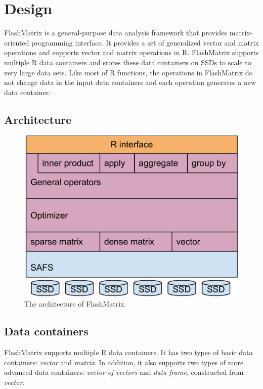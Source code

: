 \section{Design}

FlashMatrix is a general-purpose data analysis framework that provides
matrix-oriented programming interface. It provides a set of generalized
vector and matrix operations and supports vector and matrix operations in R.
FlashMatrix supports multiple R data containers and stores these data containers
on SSDs to scale to very large data sets. Like most of R functions,
the operations in FlashMatrix do not change data in the input data containers
and each operation generates a new data container.

\subsection{Architecture}

\begin{figure}
\centering
\includegraphics[scale=0.3]{./architecture.pdf}
\vspace{-5pt}
\caption{The architecture of FlashMatrix.}
\vspace{-5pt}
\label{arch}
\end{figure}

\subsection{Data containers}
FlashMatrix supports multiple R data containers. It has two types of basic
data containers: \textit{vector} and \textit{matrix}. In addition, it also
supports two types of more advanced data containers: \textit{vector of vectors}
and \textit{data frame}, constructed from \textit{vector}.

